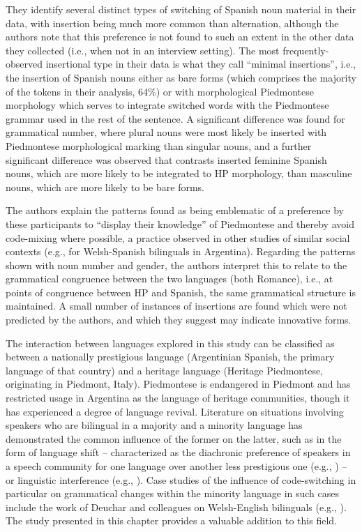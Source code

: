 \documentclass[output=paper]{langscibook}
\begin{document}
They identify several distinct types of switching of Spanish noun material in their data, with insertion being much more common than alternation, although the authors note that this preference is not found to such an extent in the other data they collected (i.e., when not in an interview setting). The most frequently-observed insertional type in their data is what they call “minimal insertions”, i.e., the insertion of Spanish nouns either as bare forms (which comprises the majority of the tokens in their analysis, 64\%) or with morphological Piedmontese morphology which serves to integrate switched words with the Piedmontese grammar used in the rest of the sentence. A significant difference was found for grammatical number, where plural nouns were most likely be inserted with Piedmontese morphological marking than singular nouns, and a further significant difference was observed that contrasts inserted feminine Spanish nouns, which are more likely to be integrated to HP morphology, than masculine nouns, which are more likely to be bare forms.

The authors explain the patterns found as being emblematic of a preference by these participants to “display their knowledge” of Piedmontese and thereby avoid code-mixing where possible, a practice observed in other studies of similar social contexts (e.g., \citet{CarterEtAl2011} for Welsh-Spanish bilinguals in Argentina). Regarding the patterns shown with noun number and gender, the authors interpret this to relate to the grammatical congruence between the two languages (both Romance), i.e., at points of congruence between HP and Spanish, the same grammatical structure is maintained. A small number of instances of insertions are found which were not predicted by the authors, and which they suggest may indicate innovative forms.

The interaction between languages explored in this study can be classified as between a nationally prestigious language (Argentinian Spanish, the primary language of that country) and a heritage language (Heritage Piedmontese, originating in Piedmont, Italy). Piedmontese is endangered in Piedmont and has restricted usage in Argentina as the language of heritage communities, though it has experienced a degree of language revival. Literature on situations involving speakers who are bilingual in a majority and a minority language has demonstrated the common influence of the former on the latter, such as in the form of language shift – characterized as the diachronic preference of speakers in a speech community for one language over another less prestigious one (e.g., \citealt{AppelMuysken2006}) – or linguistic interference (e.g., \citealt{ThomasonKaufman1988}). Case studies of the influence of code-switching in particular on grammatical changes within the minority language in such cases include the work of Deuchar and colleagues on Welsh-English bilinguals (e.g., \citealt{DeucharDavies2009}). The study presented in this chapter provides a valuable addition to this field.
\end{document}
